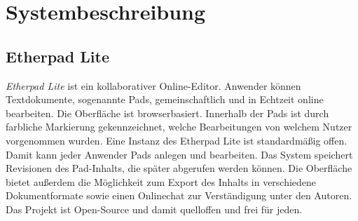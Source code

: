 \section{Systembeschreibung} %
\label{sec:system}

\subsection{Etherpad Lite}
\label{sub:system:etherpad}

\textit{Etherpad Lite} ist ein kollaborativer Online-Editor. Anwender können Textdokumente, sogenannte Pads, gemeinschaftlich und in Echtzeit online bearbeiten. Die Oberfläche ist browserbasiert. Innerhalb der Pads ist durch farbliche Markierung gekennzeichnet, welche Bearbeitungen von welchem Nutzer vorgenommen wurden. Eine Instanz des Etherpad Lite ist standardmäßig offen. Damit kann jeder Anwender Pads anlegen und bearbeiten. Das System speichert Revisionen des Pad-Inhalts, die später abgerufen werden können. Die Oberfläche bietet außerdem die Möglichkeit zum Export des Inhalts in verschiedene Dokumentformate sowie einen Onlinechat zur Verständigung unter den Autoren.\\
Das Projekt ist Open-Source und damit quelloffen und frei für jeden.



